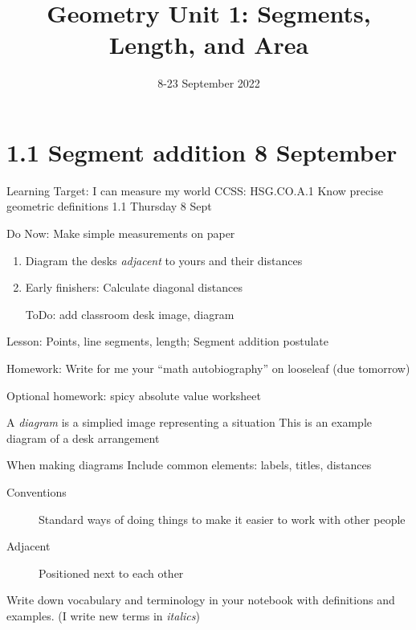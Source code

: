 

\title{Geometry Unit 1: Segments, Length, and Area}
\date{8-23 September 2022}


\frame{\titlepage}

\section[Outline]{}
\frame{\tableofcontents}

\section{1.1 Segment addition \hfill 8 September}
\begin{frame}{Learning Target: I can measure my world}
  {CCSS: HSG.CO.A.1 Know precise geometric definitions \hfill \alert{1.1 Thursday 8 Sept}}
  \begin{block}{Do Now: Make simple measurements on paper}
    \begin{enumerate}
        \item Diagram the desks \emph{adjacent} to yours and their distances
        \item Early finishers: Calculate diagonal distances
        \item [ToDo:] add classroom desk image, diagram
    \end{enumerate}
    \end{block}
    Lesson: Points, line segments, length; Segment addition postulate \par \medskip
    Homework: Write for me your ``math autobiography'' on looseleaf (due tomorrow) \par \medskip
    Optional homework: spicy absolute value worksheet
  \end{frame}

\begin{frame}{A \emph{diagram} is a simplied image representing a situation}
  {This is an example diagram of a desk arrangement}
  \begin{block}{When making diagrams}
    Include common elements: labels, titles, distances \par \medskip
  \end{block}
  \begin{description}
    \item[Conventions] Standard ways of doing things to make it easier to work with other people
    \item[Adjacent] Positioned next to each other
  \end{description} \vspace{2cm}
  Write down vocabulary and terminology in your notebook with definitions and examples. (I write new terms in \emph{italics})
  \end{frame}

